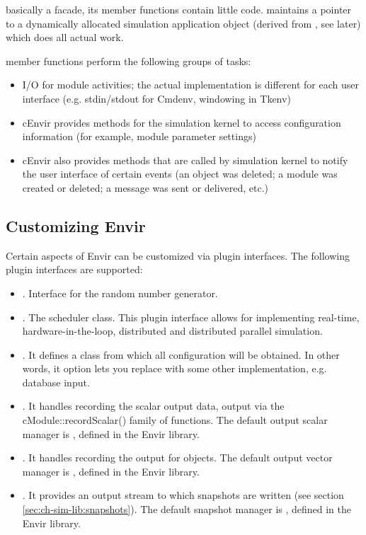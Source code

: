  basically a facade, its member functions
contain little code.  maintains a pointer to a
dynamically allocated simulation application object (derived from
, see later) which does all actual work.


 member functions perform the following groups of tasks:
\begin{itemize}
  \item I/O for module activities; the actual implementation is different
    for each user interface (e.g. stdin/stdout for Cmdenv, windowing
    in Tkenv)
  \item cEnvir provides methods for the simulation kernel to
    access configuration information (for example, module parameter settings)
  \item cEnvir also provides methods that are called by simulation kernel to
    notify the user interface of certain events (an object was deleted;
    a module was created or deleted; a message was sent or delivered, etc.)
\end{itemize}


\subsection{Customizing Envir}
\label{sec:ch-opp-design:customization}

Certain aspects of Envir can be customized via plugin interfaces.
The following plugin interfaces are supported:

\begin{itemize}
   \item{. Interface for the random number generator.}
   \item{. The scheduler class. This plugin interface
     allows for implementing real-time, hardware-in-the-loop, distributed
     and distributed parallel simulation.}
   \item{. It defines a class
     from which all configuration will be obtained. In other words, it
     option lets you replace  with some other implementation,
     e.g. database input.}
   \item{. It handles recording the scalar output data,
     output via the cModule::recordScalar() family of functions.
     The default output scalar manager is ,
     defined in the Envir library.}
   \item{. It handles recording the output
     for  objects.
     The default output vector manager is ,
     defined in the Envir library.}
   \item{. It provides an output stream to which
     snapshots are written (see section \ref{sec:ch-sim-lib:snapshots}).
     The default snapshot manager is ,
     defined in the Envir library.}
\end{itemize}

